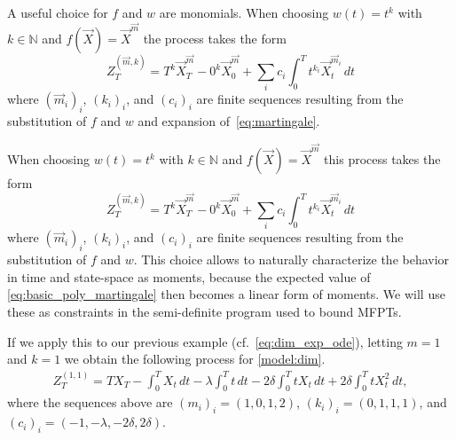 A useful choice for $f$ and $w$ are monomials.
When choosing $w(t)=t^k$ with $k\in\mathbb N$ and $f(\vec X)={\vec X}^{\vec m}$
the process takes the form
\begin{equation}\label{eq:basic_poly_martingale_app}
Z_T^{(\vec m, k)}=
         T^k \vec X_T^{\vec m}
        - 0^k \vec X_{0}^{\vec m}
        + \sum_{i}c_i\int_0^T t^{k_i} \vec X_t^{\vec m_i}\,dt
\end{equation}
where   $(\vec m_i)_i$, $(k_i)_i$, and $(c_i)_i$ are finite sequences resulting
from the substitution
of $f$ and $w$
and expansion of~\eqref{eq:martingale}.


When choosing $w(t)=t^k$ with $k\in\mathbb N$ and $f(\vec X)={\vec X}^{\vec m}$
this process takes the form
\begin{equation}\label{eq:basic_poly_martingale}
Z_T^{(\vec m, k)}=
         T^k \vec X_T^{\vec m}
        - 0^k \vec X_{0}^{\vec m}
        + \sum_{i}c_i\int_0^T t^{k_i} \vec X_t^{\vec m_i}\,dt
\end{equation}
where   $(\vec m_i)_i$, $(k_i)_i$, and $(c_i)_i$ are finite sequences resulting
from the substitution
of $f$ and $w$.
 This choice allows to naturally
characterize the behavior in time and state-space as moments, because
the expected value of \eqref{eq:basic_poly_martingale} then becomes a linear form
of moments.
We will use these as constraints in the semi-definite program used to bound MFPTs.

If we apply this to our previous example (cf.\ \eqref{eq:dim_exp_ode}), letting $m=1$ %
and $k=1$ we obtain the following process for \autoref{model:dim}.
\begin{align*}
    Z_T^{(1,1)} = TX_T - \int_0^T X_t\,dt - \lambda \int_0^T t\,dt - 2\delta
    \int_0^T t X_t\,dt +
    2{\delta}\int_0^TtX_t^2\,dt,
\end{align*}
where the sequences above are $(m_i)_i=(1,0,1,2)$, $(k_i)_i=(0,1,1,1)$,
and $(c_i)_i=(-1,-\lambda, -2\delta,2\delta)$.
